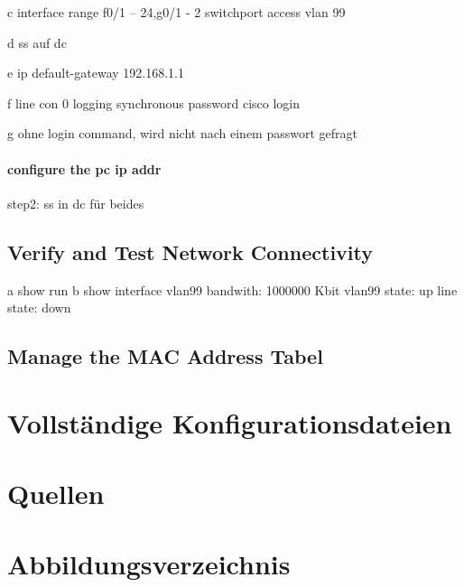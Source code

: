 \documentclass[a4paper]{article}
\begin{document}
c
interface range f0/1 – 24,g0/1 - 2
switchport access vlan 99

d
ss auf dc

e
ip default-gateway 192.168.1.1

f
line con 0 
logging synchronous
password cisco
login

g
ohne login command, wird nicht nach einem passwort gefragt


\paragraph {configure the pc ip addr}
step2:
ss in dc für beides
\subsection{Verify and Test Network Connectivity}
a
show run
b
show interface vlan99
bandwith: 1000000 Kbit
vlan99 state: up
line state: down


\subsection{Manage the MAC Address Tabel}

\newpage

\section{Vollständige Konfigurationsdateien}

\newpage

\section{Quellen}

\newpage
\section{Abbildungsverzeichnis}

\listoffigures
\end{document}
